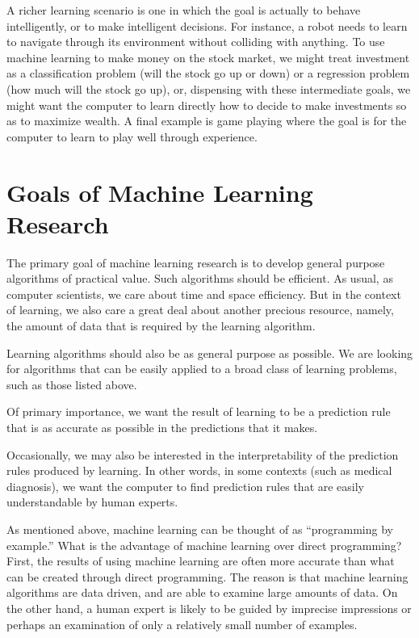 \documentclass[11pt]{article}
\begin{document}
A richer learning scenario is one in which the goal is actually to
behave intelligently, or to make intelligent decisions.
For instance, a robot needs to learn to navigate through its
environment without colliding with anything.
To use machine learning to make money on the stock market, we might
treat investment as a classification problem (will the stock go up or
down) or a regression problem (how much will the stock go up), or,
dispensing with these intermediate goals, we
might want the computer to learn directly how to decide to make
investments so as to maximize wealth.
A final example is game playing where the goal is for the computer to
learn to play well through experience.

\section{Goals of Machine Learning Research}

The primary goal of machine learning research is to develop general
purpose algorithms of practical value.
Such algorithms should be efficient.
As usual, as computer scientists, we care about time and space
efficiency.
But in the context of learning, we also care a great deal about
another precious resource, namely, the amount of data that is required
by the learning algorithm.

Learning algorithms should also be as general purpose as possible.
We are looking for algorithms that can be easily applied to a broad
class of learning problems, such as those listed above.

Of primary importance,
we want the result of learning to be a prediction rule that
is as accurate as possible in the predictions that it makes.

Occasionally, we may also be interested in the interpretability of the
prediction rules produced by learning.
In other words, in some contexts (such as medical diagnosis), we want
the computer to find prediction rules that are easily understandable
by human experts.

As mentioned above, machine learning can be thought of as
``programming by example.''
What is the advantage of machine learning over direct programming?
First, the results of using machine learning are often more accurate
than what can be created through direct programming.
The reason is that machine learning algorithms are data driven, and
are able to examine large amounts of data.
On the other hand, a human expert is likely to be guided by imprecise
impressions or perhaps an examination of only a relatively small
number of examples.
\end{document}
